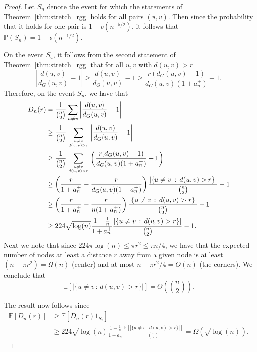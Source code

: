 \documentclass{article} %
\begin{document}
\begin{proof}
Let $S_n$ denote the event for which the statements of Theorem~\ref{thm:stretch_rgg} holds for all pairs $(u,v)$. Then since the probability that it holds for one pair is $1 - o(n^{-5/2})$, it follows that $\mathbb{P}(S_n) = 1 - o(n^{-1/2})$.

On the event $S_n$, it follows from the second statement of Theorem~\ref{thm:stretch_rgg} that for all $u,v$ with $d(u,v) > r$
\[
	\left|\frac{d(u,v)}{d_G(u,v)} - 1\right| \ge \frac{d(u,v)}{d_G(u,v)} - 1
	\ge \frac{r(d_G(u,v) - 1)}{d_G(u,v)(1+a_n^+)} - 1.
\]
Therefore, on the event $S_n$, we have that
\begin{align*}
	D_n(r) &= \frac{1}{\binom{n}{2}} \sum_{u \ne v} \left|\frac{d(u,v)}{d_G(u,v)} - 1\right|\\
	&\ge \frac{1}{\binom{n}{2}} \sum_{u \ne v \atop d(u,v) > r} \left|\frac{d(u,v)}{d_G(u,v)} - 1\right|\\
	&\ge \frac{1}{\binom{n}{2}} \sum_{u \ne v \atop d(u,v) > r} \left(\frac{r(d_G(u,v) - 1)}{d_G(u,v)(1+a_n^+)} - 1\right)\\
	&\ge \left(\frac{r}{1 + a_n^+} - \frac{r}{d_G(u,v)(1+a_n^+)}\right) 
		\frac{|\{u \ne v \, :\, d(u,v) > r\}|}{\binom{n}{2}} - 1\\
	&\ge \left(\frac{r}{1 + a_n^+} - \frac{r}{n(1+a_n^+)}\right) 
			\frac{|\{u \ne v \, :\, d(u,v) > r\}|}{\binom{n}{2}} - 1\\
	&\ge 224 \sqrt{\log(n)} \frac{1 - \frac{1}{n}}{1 + a_n^+} \frac{|\{u \ne v \, :\, d(u,v) > r\}|}{\binom{n}{2}} - 1.
\end{align*}
Next we note that since $224 \pi \log(n) \le \pi r^2 \le \pi n/4$, we have that the expected number of nodes at least a distance $r$ away from a given node is at least $(n - \pi r^2) = \Omega(n)$ (center) and at most $n - \pi r^2/4 = O(n)$ (the corners). We conclude that
\[
	\mathbb{E}[|\{u \ne v \, :\, d(u,v) > r\}|] = \Theta\left(\binom{n}{2}\right).
\]

The result now follows since
\begin{align*}
	\mathbb{E}[D_n(r)] &\ge \mathbb{E}[D_n(r) 1_{S_n}] \\
	&\ge 224 \sqrt{\log(n)} \frac{1 - \frac{1}{n}}{1 + a_n^+} 
		\frac{\mathbb{E}[|\{u \ne v \, :\, d(u,v) > r\}|]}{\binom{n}{2}}
		= \Omega(\sqrt{\log(n)}).
\end{align*}
\end{proof}
\end{document}
